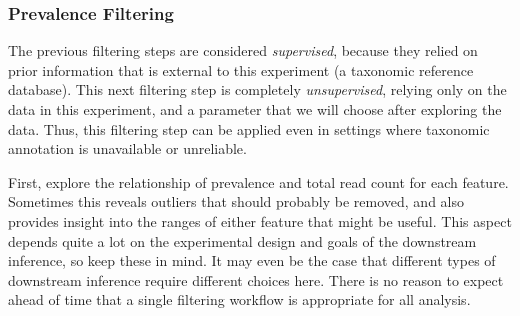 \subsubsection*{Prevalence Filtering}

The previous filtering steps are considered \emph{supervised},
because they relied on prior information
that is external to this experiment
(a taxonomic reference database).
This next filtering step is completely \emph{unsupervised},
relying only on the data in this experiment,
and a parameter that we will choose after exploring the data.
Thus, this filtering step can be applied even in settings
where taxonomic annotation is unavailable or unreliable.

First, explore the relationship of
prevalence and total read count
for each feature.
Sometimes this reveals outliers that should probably be removed,
and also provides insight into the ranges of either feature
that might be useful.
This aspect depends quite a lot on the experimental design
and goals of the downstream inference,
so keep these in mind.
It may even be the case that different types of downstream inference
require different choices here.
There is no reason to expect ahead of time that
a single filtering workflow is appropriate for all analysis.



